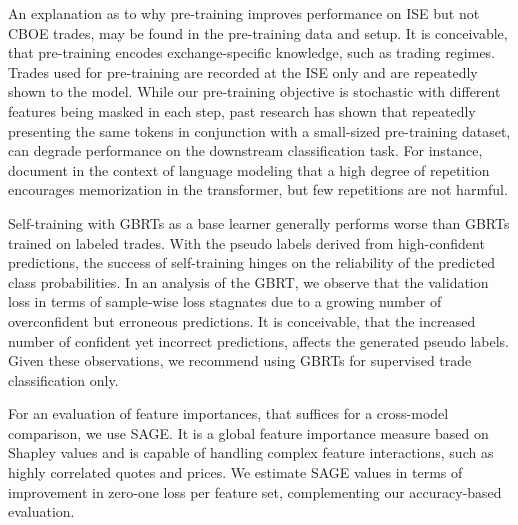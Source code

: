 \documentclass[oneside,a4paper,10pt]{article} %
\begin{document}
An explanation as to why pre-training improves performance on \gls{ISE} but not \gls{CBOE} trades, may be found in the pre-training data and setup. It is conceivable, that pre-training encodes exchange-specific knowledge, such as trading regimes. Trades used for pre-training are recorded at the \gls{ISE} only and are repeatedly shown to the model. While our pre-training objective is stochastic with different features being masked in each step, past research has shown that repeatedly presenting the same tokens in conjunction with a small-sized pre-training dataset, can degrade performance on the downstream classification task. For instance, \textcite[][]{raffelExploringLimitsTransfer2020} document in the context of language modeling that a high degree of repetition encourages memorization in the transformer, but few repetitions are not harmful.

Self-training with \glspl{GBRT} as a base learner generally performs worse than \glspl{GBRT} trained on labeled trades. With the pseudo labels derived from high-confident predictions, the success of self-training hinges on the reliability of the predicted class probabilities. In an analysis of the \gls{GBRT}, we observe that the validation loss in terms of sample-wise loss stagnates due to a growing number of overconfident but erroneous predictions. It is conceivable, that the increased number of confident yet incorrect predictions, affects the generated pseudo labels. Given these observations, we recommend using \glspl{GBRT} for supervised trade classification only. 

For an evaluation of feature importances, that suffices for a cross-model comparison, we use \gls{SAGE}. It is a global feature importance measure based on Shapley values and is capable of handling complex feature interactions, such as highly correlated quotes and prices. We estimate \gls{SAGE} values in terms of improvement in zero-one loss per feature set, complementing our accuracy-based evaluation.
\end{document}
